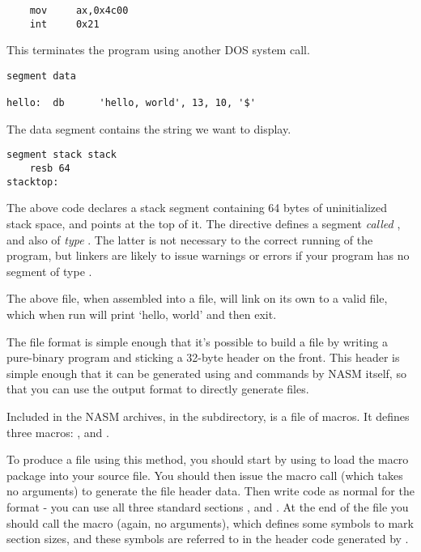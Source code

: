 \begin{lstlisting}
    mov     ax,0x4c00
    int     0x21
\end{lstlisting}

This terminates the program using another DOS system call.

\begin{lstlisting}
segment data

hello:  db      'hello, world', 13, 10, '$'
\end{lstlisting}

The data segment contains the string we want to display.

\begin{lstlisting}
segment stack stack
    resb 64
stacktop:
\end{lstlisting}

The above code declares a stack segment containing 64 bytes of
uninitialized stack space, and points  at the top of it.
The directive  defines a segment \emph{called}
, and also of \emph{type} . The latter is not
necessary to the correct running of the program, but linkers are
likely to issue warnings or errors if your program has no segment of
type .

The above file, when assembled into a  file, will link on
its own to a valid  file, which when run will print `hello,
world' and then exit.


The  file format is simple enough that it's possible to
build a  file by writing a pure-binary program and sticking
a 32-byte header on the front. This header is simple enough that it
can be generated using  and  commands by NASM itself,
so that you can use the  output format to directly generate
 files.

Included in the NASM archives, in the 
subdirectory, is a file  of macros. It defines three
macros: ,  and
.

To produce a  file using this method, you should start by
using  to load the  macro package into
your source file. You should then issue the  macro call
(which takes no arguments) to generate the file header data. Then
write code as normal for the  format - you can use all three
standard sections ,  and . At the end of
the file you should call the  macro (again, no arguments),
which defines some symbols to mark section sizes, and these symbols
are referred to in the header code generated by .


